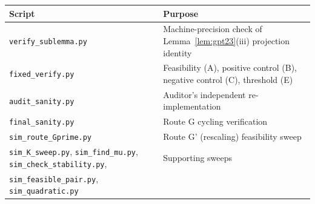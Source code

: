 \documentclass[11pt]{article}
\theoremstyle{definition}
\theoremstyle{remark}
\begin{document}
\begin{center}
\small
\begin{tabular}{ll}
\toprule
Script & Purpose \\
\midrule
\texttt{verify\_sublemma.py}  & Machine-precision check of Lemma~\ref{lem:gpt23}(iii) projection identity \\
\texttt{fixed\_verify.py}     & Feasibility (A), positive control (B), negative control (C), threshold (E) \\
\texttt{audit\_sanity.py}     & Auditor's independent re-implementation \\
\texttt{final\_sanity.py}     & Route G cycling verification \\
\texttt{sim\_route\_Gprime.py}& Route G' (rescaling) feasibility sweep \\
\texttt{sim\_K\_sweep.py}, \texttt{sim\_find\_mu.py}, \texttt{sim\_check\_stability.py}, & Supporting sweeps \\
\texttt{sim\_feasible\_pair.py}, \texttt{sim\_quadratic.py} & \\
\bottomrule
\end{tabular}
\end{center}
\end{document}
